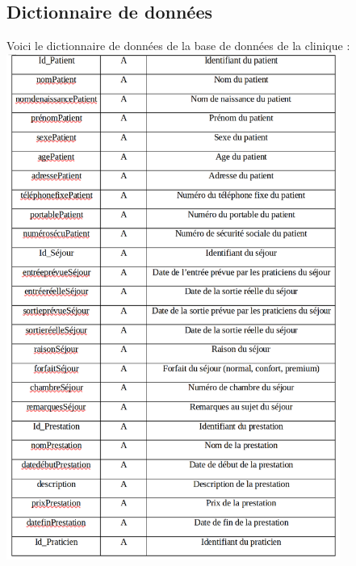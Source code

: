\documentclass[12pt]{article}
\begin{document}
{\begin{adjustwidth}{20pt}{20pt}
    \subsection{Dictionnaire de données}
    Voici le dictionnaire de données de la base de données de la clinique :\bigskip\linebreak
    \includegraphics[width=0.82\textwidth]{DD1.png}\\[4cm]

\end{adjustwidth}}
\end{document}
